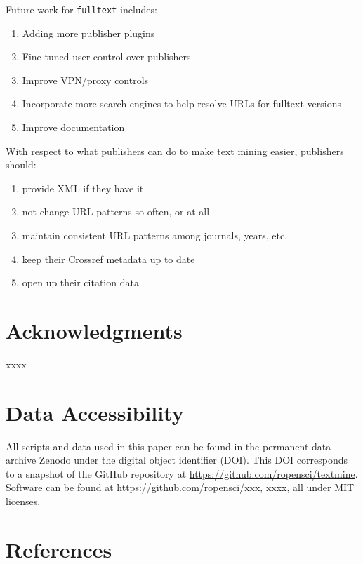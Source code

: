 \documentclass[author-year, review, 11pt]{components/elsarticle} %
\def\tightlist{}
\begin{document}
Future work for \texttt{fulltext} includes:

\begin{enumerate}
\def\labelenumi{\arabic{enumi}.}
\tightlist
\item
  Adding more publisher plugins
\item
  Fine tuned user control over publishers
\item
  Improve VPN/proxy controls
\item
  Incorporate more search engines to help resolve URLs for fulltext
  versions
\item
  Improve documentation
\end{enumerate}

With respect to what publishers can do to make text mining easier,
publishers should:

\begin{enumerate}
\def\labelenumi{\arabic{enumi}.}
\tightlist
\item
  provide XML if they have it
\item
  not change URL patterns so often, or at all
\item
  maintain consistent URL patterns among journals, years, etc.
\item
  keep their Crossref metadata up to date
\item
  open up their citation data
\end{enumerate}

\hypertarget{acknowledgments}{%
\section{Acknowledgments}\label{acknowledgments}}

xxxx

\hypertarget{data-accessibility}{%
\section{Data Accessibility}\label{data-accessibility}}

All scripts and data used in this paper can be found in the permanent
data archive Zenodo under the digital object identifier (DOI). This DOI
corresponds to a snapshot of the GitHub repository at
\url{https://github.com/ropensci/textmine}. Software can be found at
\url{https://github.com/ropensci/xxx}, xxxx, all under MIT licenses.

\hypertarget{references}{%
\section*{References}\label{references}}
\end{document}
